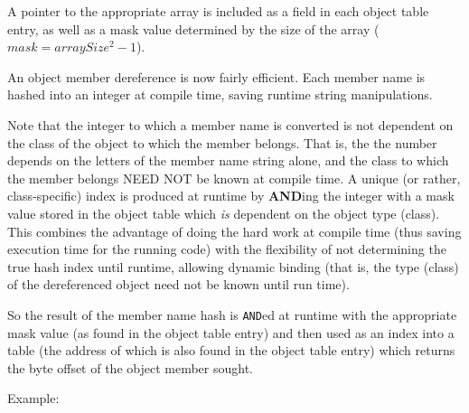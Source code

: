 A pointer to the appropriate array is included as a field in each
object table entry, as well as a mask value determined by the size of the
array ($ mask = arraySize^{2} - 1 $).

An object member dereference is now fairly efficient.  Each member
name is hashed into an integer at compile time, saving runtime
string manipulations.

Note that the integer to which a member name is converted is not
dependent on the class of the object to which the member belongs.
That is, the the number depends on the letters of the member name
string alone, and the class to which the member belongs NEED NOT
be known at compile time.  A unique (or rather, class-specific)
index is produced at runtime by {\bf AND}ing the integer with a mask
value stored in the object table which {\em is} dependent on the
object type (class).  This combines the advantage of doing
the hard work at compile time (thus saving execution time for
the running code) with the flexibility of not determining the true
hash index until runtime, allowing dynamic binding (that is, the type
(class) of the dereferenced object need not be known until run time).

So the result of the member name hash is {\tt AND}ed at runtime with the
appropriate mask value (as found in the object table entry) and then used
as an index into a table (the address of which is also found in the object
table entry) which returns the byte offset of the object member sought.

Example:

